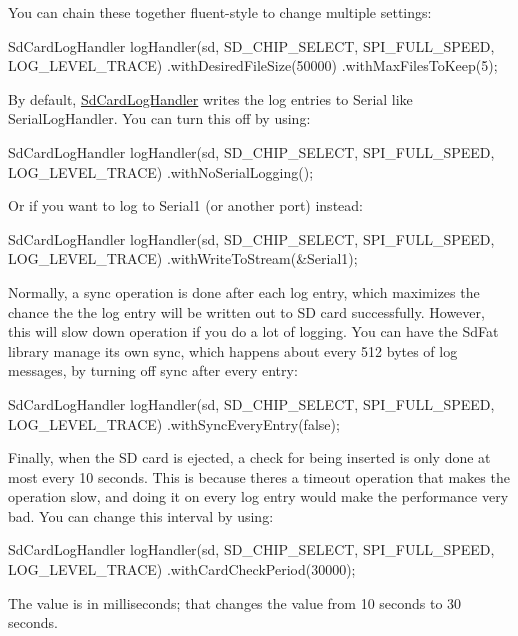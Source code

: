 You can chain these together fluent-\/style to change multiple settings\+:


\begin{DoxyCode}
SdCardLogHandler logHandler(sd, SD\_CHIP\_SELECT, SPI\_FULL\_SPEED, LOG\_LEVEL\_TRACE)
    .withDesiredFileSize(50000)
    .withMaxFilesToKeep(5);
\end{DoxyCode}


By default, \mbox{\hyperlink{class_sd_card_log_handler}{Sd\+Card\+Log\+Handler}} writes the log entries to Serial like Serial\+Log\+Handler. You can turn this off by using\+:


\begin{DoxyCode}
SdCardLogHandler logHandler(sd, SD\_CHIP\_SELECT, SPI\_FULL\_SPEED, LOG\_LEVEL\_TRACE)
    .withNoSerialLogging();
\end{DoxyCode}


Or if you want to log to Serial1 (or another port) instead\+:


\begin{DoxyCode}
SdCardLogHandler logHandler(sd, SD\_CHIP\_SELECT, SPI\_FULL\_SPEED, LOG\_LEVEL\_TRACE)
    .withWriteToStream(&Serial1);
\end{DoxyCode}


Normally, a sync operation is done after each log entry, which maximizes the chance the the log entry will be written out to SD card successfully. However, this will slow down operation if you do a lot of logging. You can have the Sd\+Fat library manage its own sync, which happens about every 512 bytes of log messages, by turning off sync after every entry\+:


\begin{DoxyCode}
SdCardLogHandler logHandler(sd, SD\_CHIP\_SELECT, SPI\_FULL\_SPEED, LOG\_LEVEL\_TRACE)
    .withSyncEveryEntry(false);
\end{DoxyCode}


Finally, when the SD card is ejected, a check for being inserted is only done at most every 10 seconds. This is because there\textquotesingle{}s a timeout operation that makes the operation slow, and doing it on every log entry would make the performance very bad. You can change this interval by using\+:


\begin{DoxyCode}
SdCardLogHandler logHandler(sd, SD\_CHIP\_SELECT, SPI\_FULL\_SPEED, LOG\_LEVEL\_TRACE)
    .withCardCheckPeriod(30000);
\end{DoxyCode}


The value is in milliseconds; that changes the value from 10 seconds to 30 seconds. 